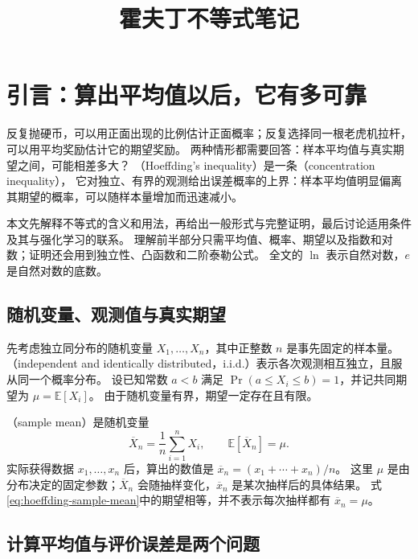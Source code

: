 \documentclass[UTF8]{ctexart}
\title{霍夫丁不等式笔记}
\author{}
\date{}
\begin{document}
\maketitle

\section{引言：算出平均值以后，它有多可靠}
\label{sec:hoeffding-introduction}

反复抛硬币，可以用正面出现的比例估计正面概率；反复选择同一根老虎机拉杆，可以用平均奖励估计它的期望奖励。
两种情形都需要回答：样本平均值与真实期望之间，可能相差多大？
（Hoeffding's inequality）是一条（concentration inequality），
它对独立、有界的观测给出误差概率的上界：样本平均值明显偏离其期望的概率，可以随样本量增加而迅速减小。

本文先解释不等式的含义和用法，再给出一般形式与完整证明，最后讨论适用条件及其与强化学习的联系。
理解前半部分只需平均值、概率、期望以及指数和对数；证明还会用到独立性、凸函数和二阶泰勒公式。
全文的 $\ln$ 表示自然对数，$e$ 是自然对数的底数。

\subsection{随机变量、观测值与真实期望}

先考虑独立同分布的随机变量 $X_1,\ldots,X_n$，其中正整数 $n$ 是事先固定的样本量。
（independent and identically distributed，i.i.d.）表示各次观测相互独立，且服从同一个概率分布。
设已知常数 $a<b$ 满足 $\Pr(a\leq X_i\leq b)=1$，并记共同期望为 $\mu=\mathbb E[X_i]$。
由于随机变量有界，期望一定存在且有限。

（sample mean）是随机变量
\begin{equation}
  \overline X_n=\frac1n\sum_{i=1}^{n}X_i,
  \qquad \mathbb E[\overline X_n]=\mu.
  \label{eq:hoeffding-sample-mean}
\end{equation}
实际获得数据 $x_1,\ldots,x_n$ 后，算出的数值是
$\overline x_n=(x_1+\cdots+x_n)/n$。
这里 $\mu$ 是由分布决定的固定参数；$\overline X_n$ 会随抽样变化，$\overline x_n$ 是某次抽样后的具体结果。
式\eqref{eq:hoeffding-sample-mean}中的期望相等，并不表示每次抽样都有 $\overline x_n=\mu$。

\subsection{计算平均值与评价误差是两个问题}
\end{document}
